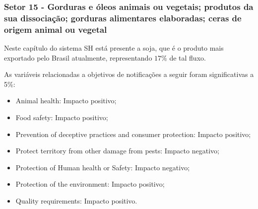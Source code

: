 \subsubsection{Setor 15 - Gorduras e óleos animais ou vegetais; produtos da sua dissociação; gorduras alimentares elaboradas; ceras de origem animal ou vegetal}


 


Neste capítulo do sistema SH está presente a soja, que é o produto mais exportado pelo Brasil atualmente, representando $17\%$ de tal fluxo.

As variáveis relacionadas a objetivos de notificações a seguir foram significativas a 5\%:
\begin{itemize}
    \item Animal health: Impacto positivo;
    \item Food safety: Impacto positivo;
    \item Prevention of deceptive practices and consumer protection: Impacto positivo;
    \item Protect territory from other damage from pests: Impacto negativo;
    \item Protection of Human health or Safety: Impacto negativo;
    \item Protection of the environment: Impacto positivo;
    \item Quality requirements: Impacto positivo.
\end{itemize}
